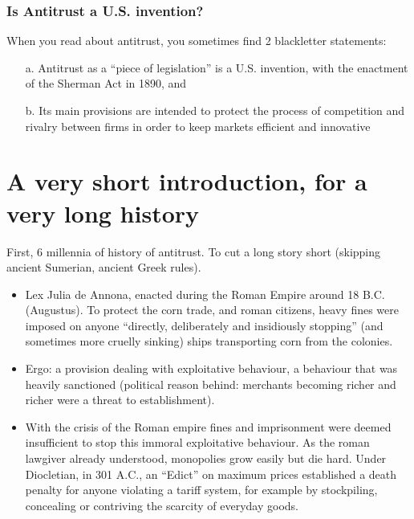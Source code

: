             \subsubsection{Is Antitrust a U.S. invention?}
                When you read about antitrust, you sometimes find 2 blackletter statements: 
                \begin{itemize}
                    \item[a.] Antitrust as a “piece of legislation” is a U.S. invention, with the enactment of the Sherman Act in 1890, and 
                    \item[b.] Its main provisions are intended to protect the process of competition and rivalry between firms in order to keep markets efficient and innovative
                \end{itemize}
    

\newpage
\section{A very short introduction, for a very long history}

        First, 6 millennia of history of antitrust. To cut a long story short (skipping ancient Sumerian, ancient Greek rules).
        \begin{itemize}
            \item Lex Julia de Annona, enacted during the Roman Empire around 18 B.C. (Augustus). To protect the corn trade, and roman citizens, heavy fines were imposed on anyone “directly, deliberately and insidiously stopping” (and sometimes more cruelly sinking) ships transporting corn from the colonies. 
            \item Ergo: a provision dealing with exploitative behaviour, a behaviour that was heavily sanctioned (political reason behind: merchants becoming richer and richer were a threat to establishment).  
            \item With the crisis of the Roman empire fines and imprisonment were deemed insufficient to stop this immoral exploitative behaviour. As the roman lawgiver already understood, monopolies grow easily but die hard. Under Diocletian, in 301 A.C., an “Edict” on maximum prices established a death penalty for anyone violating a tariff system, for example by stockpiling, concealing or contriving the scarcity of everyday goods. 
        \end{itemize}

